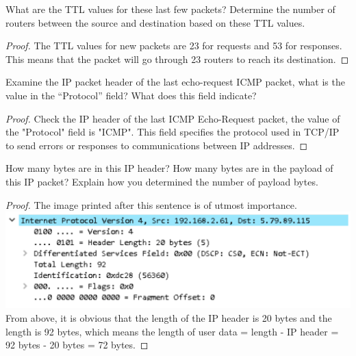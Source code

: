 \documentclass[../main.tex]{subfiles}
\begin{document}
\begin{wts}
    What are the TTL values for these last few packets? Determine the number of routers between the source and destination based on these TTL values.
\end{wts}
\begin{proof}
    The TTL values for new packets are 23 for requests and 53 for responses. This means that the packet will go through 23 routers to reach its destination.
\end{proof}
\newpage

\begin{wts}
    Examine the IP packet header of the last echo-request ICMP packet, what is the value in the “Protocol” field? What does this field indicate?    
\end{wts}
\begin{proof}
    Check the IP header of the last ICMP Echo-Request packet, the value of the "Protocol" field is "ICMP". This field specifies the protocol used in TCP/IP to send errors or responses to communications between IP addresses.
\end{proof}
\newpage

\begin{wts}
    How many bytes are in this IP header? How many bytes are in the payload of this IP packet? Explain how you determined the number of payload bytes.
\end{wts}
\begin{proof}
    The image printed after this sentence is of utmost importance.\\
    \includegraphics[width=\textwidth]{subfiles/images/PART1_Q6.png}
    From above, it is obvious that the length of the IP header is 20 bytes and the length is 92 bytes, which means the length of user data = length - IP header = 92 bytes - 20 bytes = 72 bytes.
\end{proof}
\newpage
\end{document}
